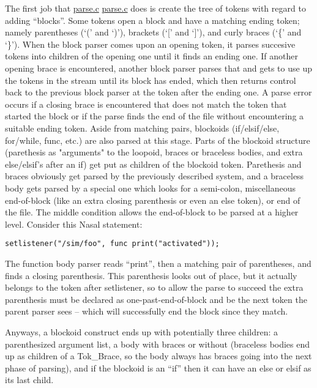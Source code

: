 \documentclass{article}
\newcommand{\nasalsourcefile}[2][]{%
  \ifthenelse{\isempty{#1}}%
    {%
      \textcolor{source}{%
        \href{https://github.com/andyross/nasal/blob/master/src/#2}{#2}%
      }%
    }%
    {%
      \textcolor{source}{%
        \href{https://github.com/andyross/nasal/blob/master/src/#2\#L#1}{#2}%
      }%
    }%
}
\newcommand{\Tok}[1]{\textcolor{opcode}{\sc Tok\_#1}}
\begin{document}
The first job that \nasalsourcefile{parse.c} does is create the tree of tokens with regard to adding ``blocks''.  Some tokens open a block and have a matching ending token; namely parentheses (`(' and `)'), brackets (`[' and `]'), and curly braces (`\{' and `\}').  When the block parser comes upon an opening token, it parses succesive tokens into children of the opening one until it finds an ending one.  If another opening brace is encountered, another block parser parses that and gets to use up the tokens in the stream until its block has ended, which then returns control back to the previous block parser at the token after the ending one.  A parse error occurs if a closing brace is encountered that does not match the token that started the block or if the parse finds the end of the file without encountering a suitable ending token.  Aside from matching pairs, blockoids (\textcolor{keyword}{if}/\textcolor{keyword}{elsif}/\textcolor{keyword}{else}, \textcolor{keyword}{for}/\textcolor{keyword}{while}, \textcolor{keyword}{func}, etc.) are also parsed at this stage.  Parts of the blockoid structure (parethesis as "arguments" to the loopoid, braces or braceless bodies, and extra else/elsif's after an if) get put as children of the blockoid token.  Parethesis and braces obviously get parsed by the previously described system, and a braceless body gets parsed by a special one which looks for a semi-colon, miscellaneous end-of-block (like an extra closing parenthesis or even an else token), or end of the file.  The middle condition allows the end-of-block to be parsed at a higher level.  Consider this Nasal statement:

\begin{lstlisting}[language=nasal]
setlistener("/sim/foo", func print("activated"));
\end{lstlisting}

The function body parser reads ``print'', then a matching pair of parentheses, and finds a closing parenthesis.  This parenthesis looks out of place, but it actually belongs to the token after setlistener, so to allow the parse to succeed the extra parenthesis must be declared as one-past-end-of-block and be the next token the parent parser sees -- which will successfully end the block since they match.

Anyways, a blockoid construct ends up with potentially three children: a parenthesized argument list, a body with braces or without (braceless bodies end up as children of a \Tok{Brace}, so the body always has braces going into the next phase of parsing), and if the blockoid is an ``if'' then it can have an else or elsif as its last child.
\end{document}
